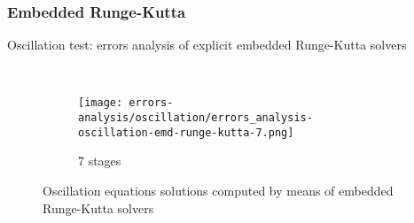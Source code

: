 \subsubsection{Embedded Runge-Kutta}

\begin{table}[!ht]
  \centering
  \caption{Oscillation test: errors analysis of explicit embedded Runge-Kutta solvers}\label{tab:oscillation_errors_emd_rk}
  \begin{subtable}[b]{0.40\textwidth}
    \centering
    \caption{7 stages}\label{tab:oscillation-emd-rk-7}
  \end{subtable}\\
\end{table}

\begin{figure}[!ht]
  \centering
  \begin{subfigure}[b]{0.45\textwidth}
    \centering
    \texttt{[image: errors-analysis/oscillation/errors\_analysis-oscillation-emd-runge-kutta-7.png]}
    \caption{7 stages}\label{fig:results-oscillation-emd-runge-kutta-7}
  \end{subfigure}\quad%
  \caption{Oscillation equations solutions computed by means of embedded Runge-Kutta solvers}\label{fig:results-oscillation-emd-runge-kutta-1-7}
\end{figure}
